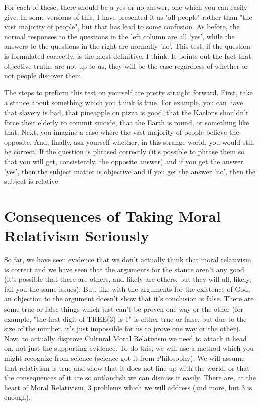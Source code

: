 For each of these, there should be a yes or no answer, one which you can easily give. In some versions of this, I have presented it as "all people" rather than "the vast majority of people", but that has lead to some confusion. As before, the normal responses to the questions in the left column are all 'yes', while the answers to the questions in the right are normally 'no'. This test, if the question is formulated correctly, is the most definitive, I think. It points out the fact that objective truths are not up-to-us, they will be the case regardless of whether or not people discover them. 

The steps to preform this test on yourself are pretty straight forward. First, take a stance about something which you think is true. For example, you can have that slavery is bad, that pineapple on pizza is good, that the Kaelons shouldn't force their elderly to commit suicide, that the Earth is round, or something like that. Next, you imagine a case where the vast majority of people believe the opposite. And, finally, ask yourself whether, in this strange world, you would still be correct.  If the question is phrased correctly (it's possible to phrase them so that you will get, consistently, the opposite answer) and if you get the answer 'yes', then the subject matter is objective and if you get the answer 'no', then the subject is relative.

\section{Consequences of Taking Moral Relativism Seriously}

So far, we have seen evidence that we don't actually think that moral relativism is correct and we have seen that the arguments for the stance aren't any good (it's possible that there are others, and likely are others, but they will all, likely, fall you the same issues). But, like with the arguments for the existence of God, an objection to the argument doesn't show that it's conclusion is false. There are some true or false things which just can't be proven one way or the other (for example, "the first digit of TREE(3) is 1" is either true or  false, but due to the size of the number, it's just impossible for us to prove one way or the other). Now, to actually disprove Cultural Moral Relativism we need to attack it head on, not just the supporting evidence. To do this, we will use a method which you might recognize from science (science got it from Philosophy). We will assume that relativism is true and show that it does not line up with the world, or that the consequences of it are so outlandish we can dismiss it easily. There are, at the heart of Moral Relativism, 3 problems which we will address (and more, but 3 is enough). 
